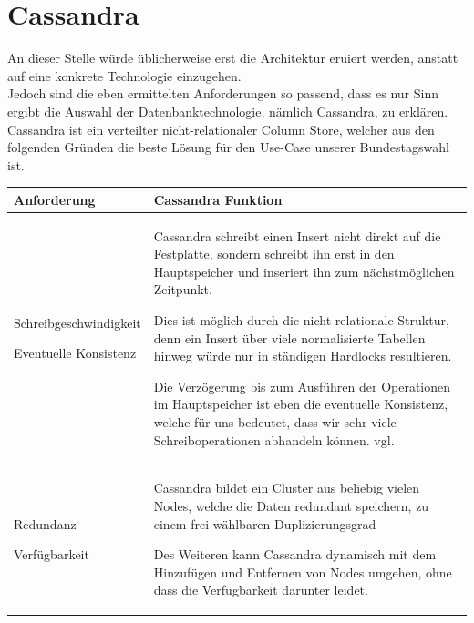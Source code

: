 \documentclass{article}  %
\begin{document}
\newpage
\section{Cassandra}
An dieser Stelle würde üblicherweise erst die Architektur eruiert werden, anstatt auf eine konkrete Technologie einzugehen. \\
Jedoch sind die eben ermittelten Anforderungen so passend, dass es nur Sinn ergibt die Auswahl der Datenbanktechnologie, nämlich Cassandra, zu erklären.\\

Cassandra ist ein verteilter nicht-relationaler Column Store, welcher aus den folgenden Gründen die beste Lösung für den Use-Case unserer Bundestagswahl ist.\\

    \begin{tabular}{  p{0.3\linewidth} | p{0.8\linewidth} }
        Anforderung & Cassandra Funktion\\ 
        \hline
     Schreibgeschwindigkeit 
        
     Eventuelle Konsistenz& Cassandra schreibt einen Insert nicht direkt auf die Festplatte, sondern schreibt ihn erst in den Hauptspeicher und inseriert ihn zum nächstmöglichen Zeitpunkt.

     \vspace{1em}

     Dies ist möglich durch die nicht-relationale Struktur, denn ein Insert über viele normalisierte Tabellen hinweg würde nur in ständigen Hardlocks resultieren.  
     
     \vspace{1em}
     Die Verzögerung bis zum Ausführen der Operationen im Hauptspeicher ist eben die eventuelle Konsistenz, welche für uns bedeutet, dass wir sehr viele Schreiboperationen abhandeln können.
     vgl. \cite{storage-engine}\\ 

     \hline
     Redundanz 
          
     Verfügbarkeit& 
     
      
    Cassandra bildet ein Cluster aus beliebig vielen Nodes, welche die Daten redundant speichern, zu einem frei wählbaren Duplizierungsgrad 
    
    \vspace{1em}

    Des Weiteren kann Cassandra dynamisch mit dem Hinzufügen und Entfernen von Nodes umgehen, ohne dass die Verfügbarkeit darunter leidet.


\end{tabular}
\end{document}
